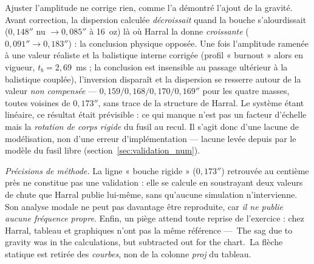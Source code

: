 \documentclass[12pt,a4paper]{article}
\begin{document}
	Ajuster l'amplitude ne corrige rien, comme l'a démontré l'ajout de la gravité. Avant correction, la dispersion calculée \emph{décroissait} quand la bouche s'alourdissait ($0{,}148''$ nu $\to 0{,}085''$ à 16~oz) là où Harral la donne \emph{croissante} ($0{,}091'' \to 0{,}183''$) : la conclusion physique opposée. Une fois l'amplitude ramenée à une valeur réaliste et la balistique interne corrigée (profil « burnout » alors en vigueur, $t_b = 2{,}69$~ms ; la conclusion est insensible au passage ultérieur à la balistique couplée), l'inversion disparaît et la dispersion se resserre autour de la valeur \emph{non compensée} --- $0{,}159 / 0{,}168 / 0{,}170 / 0{,}169''$ pour les quatre masses, toutes voisines de $0{,}173''$, sans trace de la structure de Harral. Le système étant linéaire, ce résultat était prévisible : ce qui manque n'est pas un facteur d'échelle mais la \emph{rotation de corps rigide} du fusil au recul. Il s'agit donc d'une lacune de modélisation, non d'une erreur d'implémentation --- lacune levée depuis par le modèle du fusil libre (section~\ref{sec:validation_num}).

	\emph{Précisions de méthode.} La ligne « bouche rigide » ($0{,}173''$) retrouvée au centième près ne constitue pas une validation : elle se calcule en soustrayant deux valeurs de chute que Harral publie lui-même, sans qu'aucune simulation n'intervienne. Son analyse modale ne peut pas davantage être reproduite, car \emph{il ne publie aucune fréquence propre}. Enfin, un piège attend toute reprise de l'exercice : chez Harral, tableau et graphiques n'ont pas la même référence --- \og\,The sag due to gravity was in the calculations, but subtracted out for the chart.\,\fg{} La flèche statique est retirée des \emph{courbes}, non de la colonne \emph{proj} du tableau.
\end{document}
